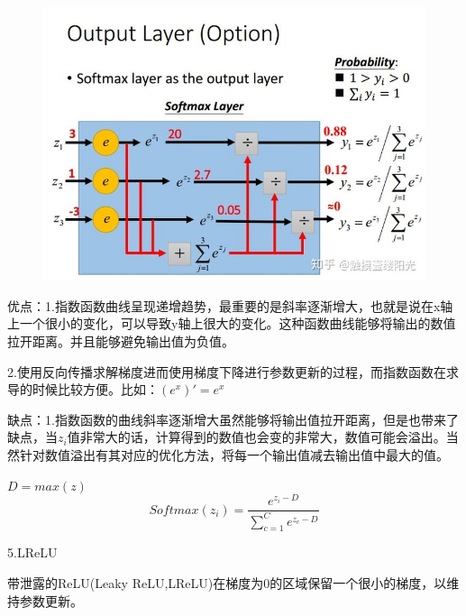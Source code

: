 \documentclass[openbib]{article}
\begin{document}
\begin{figure}[htbp]
	\centering
	\includegraphics[scale=0.25]{softmax}
\end{figure}

优点：1.指数函数曲线呈现递增趋势，最重要的是斜率逐渐增大，也就是说在x轴上一个很小的变化，可以导致y轴上很大的变化。这种函数曲线能够将输出的数值拉开距离。并且能够避免输出值为负值。

2.使用反向传播求解梯度进而使用梯度下降进行参数更新的过程，而指数函数在求导的时候比较方便。比如：$(e^x)'=e^x$

缺点：1.指数函数的曲线斜率逐渐增大虽然能够将输出值拉开距离，但是也带来了缺点，当$z_i$值非常大的话，计算得到的数值也会变的非常大，数值可能会溢出。当然针对数值溢出有其对应的优化方法，将每一个输出值减去输出值中最大的值。

$D=max(z)$
$$Softmax(z_i)=\frac{e^{z_i-D}}{\sum_{c=1}^{C}e^{z_c-D}}$$

\begin{center}
	5.LReLU
\end{center}
带泄露的ReLU(Leaky ReLU,LReLU)在梯度为0的区域保留一个很小的梯度，以维持参数更新。
\end{document}
